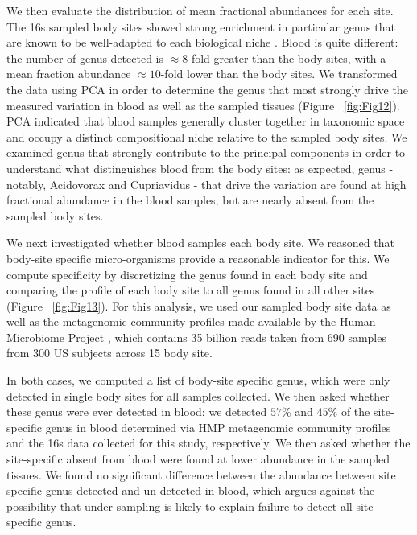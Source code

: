 We then evaluate the distribution of mean fractional abundances for each site. The 16s sampled body sites showed strong enrichment in particular genus that are known to be well-adapted to each biological niche \cite{Consortium:2012bb}. Blood is quite different: the number of genus detected is $\approx 8$-fold greater than the body sites, with a mean fraction abundance $\approx 10$-fold lower than the body sites. We transformed the data using PCA in order to determine the genus that most strongly drive the measured variation in blood as well as the sampled tissues (Figure ~\ref{fig:Fig12}). PCA indicated that blood samples generally cluster together in taxonomic space and occupy a distinct compositional niche relative to the sampled body sites. We examined genus that strongly contribute to the principal components in order to understand what distinguishes blood from the body sites: as expected, genus - notably, Acidovorax and Cupriavidus - that drive the variation are found at high fractional abundance in the blood samples, but are nearly absent from the sampled body sites. 

We next investigated whether blood samples each body site. We reasoned that body-site specific micro-organisms provide a reasonable indicator for this. We compute specificity by discretizing the genus found in each body site and comparing the profile of each body site to all genus found in all other sites (Figure ~\ref{fig:Fig13}). For this analysis, we used our sampled body site data as well as the metagenomic community profiles made available by the Human Microbiome Project \cite{Consortium:2012bb}, which contains 35 billion reads taken from 690 samples from 300 US subjects across 15 body site. 

In both cases, we computed a list of body-site specific genus, which were only detected in single body sites for all samples collected. We then asked whether these genus were ever detected in blood: we detected $57$\% and $45$\% of the site-specific genus in blood determined via HMP metagenomic community profiles and the 16s data collected for this study, respectively. We then asked whether the site-specific absent from blood were found at lower abundance in the sampled tissues. We found no significant difference between the abundance between site specific genus detected and un-detected in blood, which argues against the possibility that under-sampling is likely to explain failure to detect all site-specific genus. 

